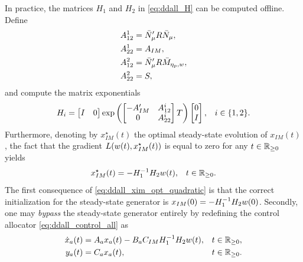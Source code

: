\begin{remark}
  \label{rem:ddall_implementation_quadratic}
  In practice, the matrices $H_1$ and $H_2$ in \eqref{eq:ddall_H} can be computed offline.
  Define
  \begin{subequations}
    \begin{align}
      A^1_{12} &= \bar{N}_{\mu}' R \bar{N}_{\mu}, \\
      A^1_{22} &= A_{IM}, \\
      A^2_{12} &= \bar{N}_{\mu}' R \bar{M}_{\eta_p,w}, \\
      A^2_{22} &= S,
    \end{align}
  \end{subequations}
  and compute the matrix exponentials
  \begin{align}
    H_i &= \begin{bmatrix} I & 0 \end{bmatrix} \exp \left(\begin{bmatrix}-A_{IM}' & A_{12}^{i} \\ 0 & A_{22}^{i}\end{bmatrix}T\right)	\begin{bmatrix} 0 \\ I \end{bmatrix}, & i\in\{1,2\}.
  \end{align}
  Furthermore, denoting by $x^\star_{IM}(t)$ the optimal steady-state evolution of $x_{IM}(t)$, the fact that the gradient $L(w(t),x^\star_{IM}(t))$ is equal to zero for any $t\in\mathbb{R}_{\geq 0}$ yields
  \begin{align}
    \label{eq:ddall_xim_opt_quadratic}
    x^\star_{IM}(t) &= -H^{-1}_1H_2w(t), & t\in\mathbb{R}_{\geq 0}.
  \end{align}
  The first consequence of \eqref{eq:ddall_xim_opt_quadratic} is that the correct initialization for the steady-state generator is $x_{IM}(0) = -H^{-1}_1H_2w(0)$. Secondly, one may \emph{bypass} the steady-state generator entirely by redefining the control allocator \eqref{eq:ddall_control_all} as
  \begin{subequations}
    \label{eq:ddall_control_all_quadratic}
    \begin{align}
      \dot{x}_a(t) & = A_ax_a(t) - B_aC_{IM}H_1^{-1}H_2 w(t), & t\in\mathbb{R}_{\geq 0},\\
		  y_a(t)       & = C_a x_a(t), & t\in\mathbb{R}_{\geq 0}.
    \end{align}
  \end{subequations}
  \closeremark
\end{remark}

